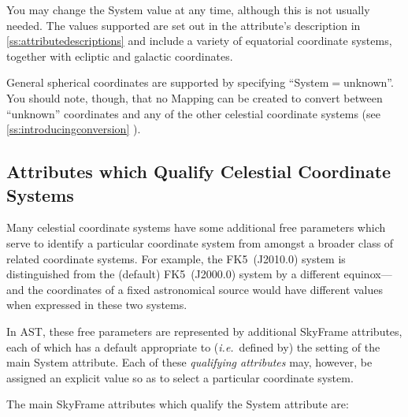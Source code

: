 \documentclass[twoside,11pt]{article}
\newcommand{\appref}[1]{Appendix~\ref{#1}}
\newcommand{\secref}[1]{\S\ref{#1}}
\renewcommand{\appref}[1]{\ref{#1}}
\renewcommand{\secref}[1]{\ref{#1}}
\begin{document}
You may change the System value at any time, although this is not
usually needed.  The values supported are set out in the attribute's
description in \appref{ss:attributedescriptions} and include a variety
of equatorial coordinate systems, together with ecliptic and galactic
coordinates.

General spherical coordinates are supported by specifying
``System$=$unknown''. You should note, though, that no Mapping can be 
created to convert between ``unknown'' coordinates and any of the other 
celestial coordinate systems (see \secref{ss:introducingconversion} ).

\subsection{Attributes which Qualify Celestial Coordinate Systems}

Many celestial coordinate systems have some additional free parameters
which serve to identify a particular coordinate system from amongst a
broader class of related coordinate systems. For example, the
FK5~(J2010.0) system is distinguished from the (default) FK5~(J2000.0)
system by a different equinox---and the coordinates of a fixed
astronomical source would have different values when expressed in
these two systems.

In AST, these free parameters are represented by additional SkyFrame
attributes, each of which has a default appropriate to
({\em{i.e.}}\ defined by) the setting of the main System
attribute. Each of these {\em{qualifying attributes}} may, however, be
assigned an explicit value so as to select a particular coordinate
system.

The main SkyFrame attributes which qualify the System attribute are:
\end{document}
